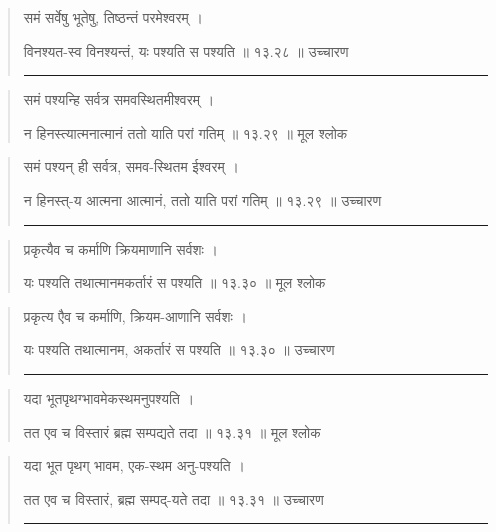 \begin{quotation}
समं सर्वेषु भूतेषु, तिष्ठन्तं परमेश्वरम्‌  ।  

विनश्यत-स्व विनश्यन्तं, यः पश्यति स पश्यति  ॥ १३.२८ ॥  उच्चारण

\noindent\rule{16cm}{0.4pt} 
\end{quotation}


\begin{quotation}

समं पश्यन्हि सर्वत्र समवस्थितमीश्वरम्‌  ।  

न हिनस्त्यात्मनात्मानं ततो याति परां गतिम्‌  ॥ १३.२९ ॥  मूल श्लोक
\end{quotation}

\begin{quotation}

समं पश्यन् ही सर्वत्र, समव-स्थितम ईश्वरम्‌  ।  

न हिनस्त्-य आत्मना आत्मानं, ततो याति परां गतिम्‌  ॥ १३.२९ ॥  उच्चारण

\noindent\rule{16cm}{0.4pt} 
\end{quotation}


\begin{quotation}

प्रकृत्यैव च कर्माणि क्रियमाणानि सर्वशः  ।  

यः पश्यति तथात्मानमकर्तारं स पश्यति  ॥ १३.३० ॥  मूल श्लोक
\end{quotation}

\begin{quotation}

प्रकृत्य एैव च कर्माणि, क्रियम-आणानि सर्वशः  ।  

यः पश्यति तथात्मानम, अकर्तारं स पश्यति  ॥ १३.३० ॥  उच्चारण

\noindent\rule{16cm}{0.4pt} 
\end{quotation}


\begin{quotation}

यदा भूतपृथग्भावमेकस्थमनुपश्यति  ।  

तत एव च विस्तारं ब्रह्म सम्पद्यते तदा  ॥ १३.३१ ॥  मूल श्लोक
\end{quotation}

\begin{quotation}

यदा भूत पृथग् भावम, एक-स्थम अनु-पश्यति  ।  

तत एव च विस्तारं, ब्रह्म सम्पद्-यते तदा  ॥ १३.३१ ॥  उच्चारण

\noindent\rule{16cm}{0.4pt} 
\end{quotation}



